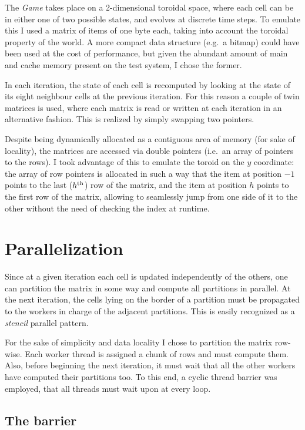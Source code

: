 \documentclass[a4paper,11pt]{article}
\begin{document}
The \emph{Game} takes place on a 2-dimensional toroidal space, where each cell can be in either one of two possible states, and evolves at discrete time steps. To emulate this I used a matrix of items of one byte each, taking into account the toroidal property of the world. A more compact data structure (e.g.\ a bitmap) could have been used at the cost of performance, but given the abundant amount of main and cache memory present on the test system, I chose the former.

In each iteration, the state of each cell is recomputed by looking at the state of its eight neighbour cells at the previous iteration. For this reason a couple of twin matrices is used, where each matrix is read or written at each iteration in an alternative fashion. This is realized by simply swapping two pointers.

Despite being dynamically allocated as a contiguous area of memory (for sake of locality), the matrices are accessed via double pointers (i.e.\ an array of pointers to the rows). I took advantage of this to emulate the toroid on the $y$ coordinate: the array of row pointers is allocated in such a way that the item at position $-1$ points to the last ($h^\textrm{\scriptsize{th}}$) row of the matrix, and the item at position $h$ points to the first row of the matrix, allowing to seamlessly jump from one side of it to the other without the need of checking the index at runtime.

\section{Parallelization}

Since at a given iteration each cell is updated independently of the others, one can partition the matrix in some way and compute all partitions in parallel. At the next iteration, the cells lying on the border of a partition must be propagated to the workers in charge of the adjacent partitions. This is easily recognized as a \emph{stencil} parallel pattern.

For the sake of simplicity and data locality I chose to partition the matrix row-wise. Each worker thread is assigned a chunk of rows and must compute them. Also, before beginning the next iteration, it must wait that all the other workers have computed their partitions too. To this end, a cyclic thread barrier was employed, that all threads must wait upon at every loop.

\subsection{The barrier}
\end{document}
